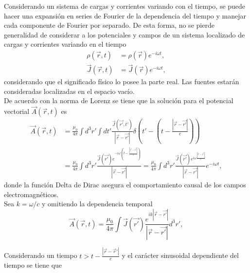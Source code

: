 \documentclass[paper=letter, fontsize=12pt,]{article}
\begin{document}
Considerando un sistema de cargas y corrientes variando con el tiempo, se puede hacer una expansión en series de Fourier de la dependencia del tiempo y manejar cada componente de Fourier por separado. De esta forma, no se pierde generalidad de considerar a los potenciales y campos de un sistema localizado de cargas y corrientes variando en el tiempo \cite{Jackson}
\begin{align*}
    \rho(\Vec{r},t)&=\rho(\Vec{r})e^{-i\omega t},\\
    \Vec{J}(\Vec{r},t)&=\Vec{J}(\Vec{r})e^{-i\omega t},
\end{align*}
considerando que el significado físico lo posee la parte real. Las fuentes estarán consideradas localizadas en el espacio vacío.\\

De acuerdo con la norma de Lorenz se tiene que la solución para el potencial vectorial $\Vec{A}(\Vec{r},t)$ es \cite{Jackson}
\begin{align}
  \Vec{A}(\Vec{r},t)&=\frac{\mu_0}{4\pi}\int d^3r'\int dt'\frac{\Vec{J}(\Vec{r'},t')}{|\Vec{r}-\Vec{r'}|}\delta\left(t'-\left(t-\frac{|\Vec{r}-\Vec{r'}|}{c}\right)\right)\nonumber\\
  &=\frac{\mu_0}{4\pi}\int d^3r'\frac{\Vec{J}(\Vec{r'})e^{-i\omega \left(t-\frac{|\Vec{r}-\Vec{r'}|}{c}\right)}}{|\Vec{r}-\Vec{r'}|}=\frac{\mu_0}{4\pi}\int d^3r'\frac{\Vec{J}(\Vec{r'})e^{i\omega \frac{|\Vec{r}-\Vec{r'}|}{c}}}{|\Vec{r}-\Vec{r'}|}e^{-i\omega t},
\end{align}
donde la función Delta de Dirac asegura el comportamiento causal de los campos electromagnéticos.\\

Sea $k=\omega/c$ y omitiendo la dependencia temporal
\begin{equation}
    \Vec{A}(\Vec{r},t)=\frac{\mu_0}{4\pi}\int \Vec{J}(\Vec{r'})\frac{e^{ik|\Vec{r}-\Vec{r'}|}}{|\Vec{r}-\Vec{r'}|} d^3r',
    \label{pot_vectorial}
\end{equation} 

Considerando un tiempo $t>t-\frac{|\Vec{r}-\Vec{r}'|}{c}$ y el carácter sinusoidal dependiente del tiempo se tiene que
\end{document}
